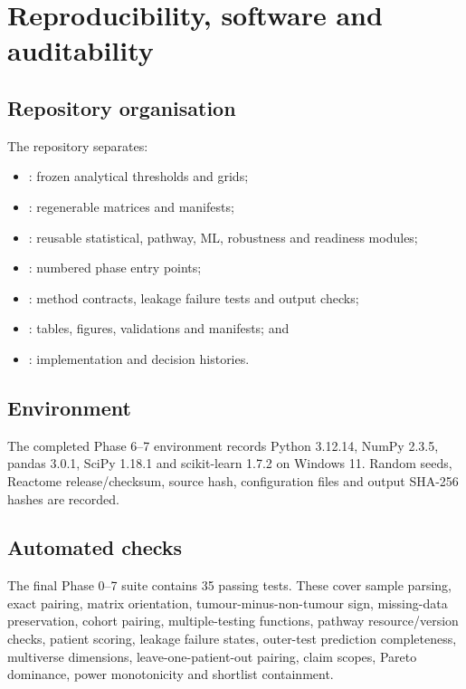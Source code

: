 \chapter{Reproducibility, software and auditability}
\label{chap:reproducibility_software_and_auditability}

\section{Repository organisation}
\label{sec:repository_organisation}

The repository separates:

\begin{itemize}
\item {}: frozen analytical thresholds and grids;
\item {}: regenerable matrices and manifests;
\item {}: reusable statistical, pathway, ML, robustness and readiness modules;
\item {}: numbered phase entry points;
\item {}: method contracts, leakage failure tests and output checks;
\item {}: tables, figures, validations and manifests; and
\item {}: implementation and decision histories.
\end{itemize}

\section{Environment}
\label{sec:environment}

The completed Phase 6–7 environment records Python 3.12.14, NumPy 2.3.5, pandas 3.0.1, SciPy 1.18.1 and scikit-learn 1.7.2 on Windows 11. Random seeds, Reactome release/checksum, source hash, configuration files and output SHA-256 hashes are recorded.

\section{Automated checks}
\label{sec:automated_checks}

The final Phase 0–7 suite contains 35 passing tests. These cover sample parsing, exact pairing, matrix orientation, tumour-minus-non-tumour sign, missing-data preservation, cohort pairing, multiple-testing functions, pathway resource/version checks, patient scoring, leakage failure states, outer-test prediction completeness, multiverse dimensions, leave-one-patient-out pairing, claim scopes, Pareto dominance, power monotonicity and shortlist containment.


